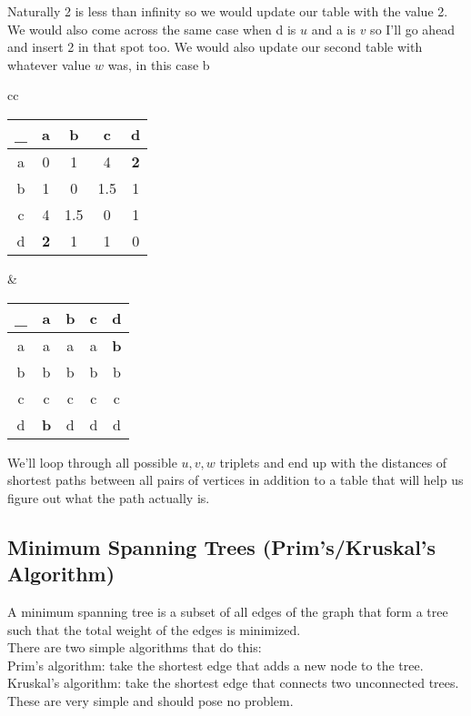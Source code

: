 \documentclass[11pt]{book}
\begin{document}
		\noindent Naturally 2 is less than infinity so we would update our table
		with the value 2. We would also come across the same case when d is $u$
		and a is $v$ so I'll go ahead and insert 2 in that spot too. We would
		also update our second table with whatever value $w$ was, in this case
		b

		\begin{center}
			\begin{tabular}{cc}
				\begin{tabular}{|c|c|c|c|c|}
					\hline
					\_ & a & b & c & d \\
					\hline
					a & 0 & 1 & 4 & \textbf{2} \\
					\hline
					b & 1 & 0 & 1.5 & 1 \\
					\hline
					c & 4 & 1.5 & 0 & 1 \\
					\hline
					d & \textbf{2} & 1 & 1 & 0 \\
					\hline
				\end{tabular} &
				\begin{tabular}{|c|c|c|c|c|}
					\hline
					\_ & a & b & c & d \\
					\hline
					a & a & a & a & \textbf{b} \\
					\hline
					b & b & b & b & b \\
					\hline
					c & c & c & c & c \\
					\hline
					d & \textbf{b} & d & d & d \\
					\hline
				\end{tabular}
			\end{tabular}
		\end{center}

		\noindent We'll loop through all possible $u, v, w$ triplets and end up
		with the distances of shortest paths between all pairs of vertices in
		addition to a table that will help us figure out what the path actually
		is.

	\pagebreak

	\subsection{Minimum Spanning Trees (Prim's/Kruskal's Algorithm)}
		A minimum spanning tree is a subset of all edges of the graph that
		form a tree such that the total weight of the edges is minimized. \\

		\noindent There are two simple algorithms that do this: \\
		Prim's algorithm: take the shortest edge that adds a new node to the tree.
		Kruskal's algorithm: take the shortest edge that connects two unconnected
		trees. \\

		\noindent These are very simple and should pose no problem.
\end{document}
